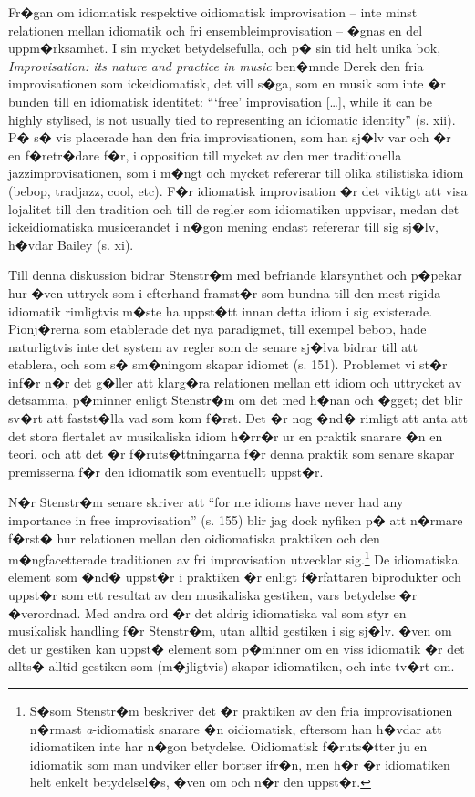 \documentclass[a4paper]{article}
\begin{document}

Fr�gan om idiomatisk respektive oidiomatisk improvisation -- inte minst relationen mellan idiomatik och fri ensembleimprovisation -- �gnas en del uppm�rksamhet. I sin mycket betydelsefulla, och p� sin tid helt unika bok, \emph{Improvisation: its nature and practice in music} ben�mnde Derek \citet{bailey92} den fria improvisationen som ickeidiomatisk, det vill s�ga, som en musik som inte �r bunden till en idiomatisk identitet: ```free' improvisation [\ldots], while it can be highly stylised, is not usually tied to representing an idiomatic identity'' (s. xii). P� s� vis placerade han den fria improvisationen, som han sj�lv var och �r en f�retr�dare f�r, i opposition till mycket av den mer traditionella jazzimprovisationen, som i m�ngt och mycket refererar till olika stilistiska idiom (bebop, tradjazz, cool, etc). F�r idiomatisk improvisation �r det viktigt att visa lojalitet till den tradition och till de regler som idiomatiken uppvisar, medan det ickeidiomatiska musicerandet i n�gon mening endast refererar till sig sj�lv, h�vdar Bailey (s. xi). 

Till denna diskussion bidrar Stenstr�m med befriande klarsynthet och p�pekar hur �ven uttryck som i efterhand framst�r som bundna till den mest rigida idiomatik rimligtvis m�ste ha uppst�tt innan detta idiom i sig existerade. Pionj�rerna som etablerade det nya paradigmet, till exempel bebop, hade naturligtvis inte det system av regler som de senare sj�lva bidrar till att etablera, och som s� sm�ningom skapar idiomet (s. 151). Problemet vi st�r inf�r n�r det g�ller att klarg�ra relationen mellan ett idiom och uttrycket av detsamma, p�minner enligt Stenstr�m om det med h�nan och �gget; det blir sv�rt att fastst�lla vad som kom f�rst. Det �r nog �nd� rimligt att anta att det stora flertalet av musikaliska idiom h�rr�r ur en praktik snarare �n en teori, och att det �r f�ruts�ttningarna f�r denna praktik som senare skapar premisserna f�r den idiomatik som eventuellt uppst�r. 
% 

N�r Stenstr�m senare skriver att ``for me idioms have never had any importance in free improvisation'' (s. 155) blir jag dock nyfiken p� att n�rmare f�rst� hur relationen mellan den oidiomatiska praktiken och den m�ngfacetterade traditionen av fri improvisation utvecklar sig.\footnote{S�som Stenstr�m beskriver det �r praktiken av den fria improvisationen n�rmast \emph{a}-idiomatisk snarare �n oidiomatisk, eftersom han h�vdar att idiomatiken inte har n�gon betydelse. Oidiomatisk f�ruts�tter ju en idiomatik som man undviker eller bortser ifr�n, men h�r �r idiomatiken helt enkelt betydelsel�s, �ven om och n�r den uppst�r.} De idiomatiska element som �nd� uppst�r i praktiken �r enligt f�rfattaren biprodukter och uppst�r som ett resultat av den musikaliska gestiken, vars betydelse �r �verordnad. Med andra ord �r det aldrig idiomatiska val som styr en musikalisk handling f�r Stenstr�m, utan alltid gestiken i sig sj�lv. �ven om det ur gestiken kan uppst� element som p�minner om en viss idiomatik �r det allts� alltid gestiken som (m�jligtvis) skapar idiomatiken, och inte tv�rt om. 
\end{document}
